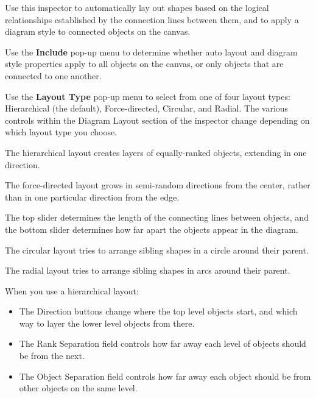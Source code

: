 \documentclass[../main.tex]{subfiles}
\begin{document}
  Use this inspector to automatically lay out shapes based on the logical relationships
  established by the connection lines between them, and to apply a diagram style to connected
  objects on the canvas.

  Use the \textbf{Include} pop-up menu to determine whether auto layout and diagram style
  properties apply to all objects on the canvas, or only objects that are connected to one
  another.

  Use the \textbf{Layout Type} pop-up menu to select from one of four layout types: Hierarchical
  (the default), Force-directed, Circular, and Radial. The various controls within the Diagram
  Layout section of the inspector change depending on which layout type you choose.

  \begin{description}[style=nextline]
    \item[{Hierarchical}] The hierarchical layout creates layers of equally-ranked objects,
      extending in one direction.

    \item[{Force-directed}] The force-directed layout grows in semi-random directions from the
      center, rather than in one particular direction from the edge.


      The top slider determines the length of the connecting lines between objects, and the bottom
      slider determines how far apart the objects appear in the diagram.
    \item[{Circular}] The circular layout tries to arrange sibling shapes in a circle around their
      parent.

    \item[{Radial}] The radial layout tries to arrange sibling shapes in arcs around their parent.

  \end{description}

  When you use a hierarchical layout:

  \begin{itemize}
    \item The Direction buttons change where the top level objects start, and which way to layer
      the lower level objects from there.
    \item The Rank Separation field controls how far away each level of objects should be from the
      next.
    \item The Object Separation field controls how far away each object should be from other
      objects on the same level.
  \end{itemize}
\end{document}
